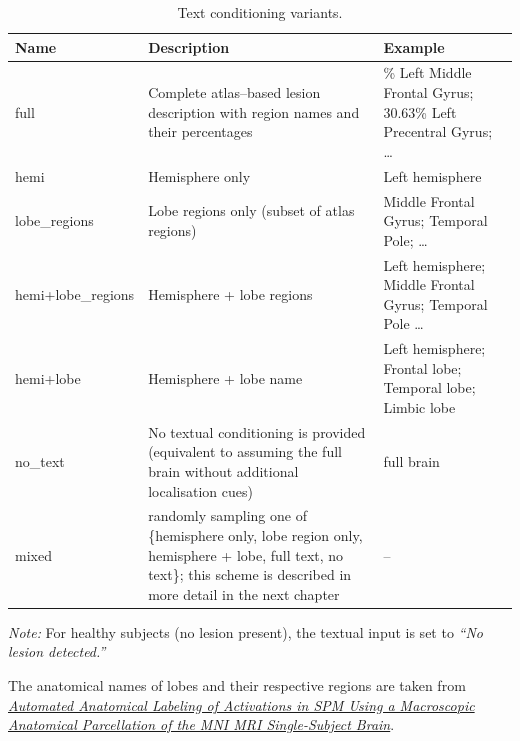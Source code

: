 \documentclass[FCD_GNN.tex]{subfiles}
\begin{document}
\begin{table}[t]
    \centering
    \caption{Text conditioning variants.}
    \label{tab:text_variants}
    \small
    \setlength{\tabcolsep}{6pt}
    \renewcommand{\arraystretch}{1.15}
        \begin{tabularx}{\textwidth}{l >{\raggedright\arraybackslash}X >{\raggedright\arraybackslash}X}
            \toprule
            \textbf{Name} & \textbf{Description} & \textbf{Example} \\
            \midrule
            full & Complete atlas--based lesion description with region names and their percentages &
            48.86\% Left Middle Frontal Gyrus; 30.63\% Left Precentral Gyrus; \dots \\
            \midrule
            hemi & Hemisphere only & Left hemisphere \\
            \midrule
            lobe\_regions & Lobe regions only (subset of atlas regions) &
            Middle Frontal Gyrus; Temporal Pole; \dots \\
            \midrule
            hemi+lobe\_regions & Hemisphere + lobe regions &
            Left hemisphere; Middle Frontal Gyrus; Temporal Pole \dots \\
            \midrule
            hemi+lobe & Hemisphere + lobe name & Left hemisphere; Frontal lobe; Temporal lobe; Limbic lobe \\
            \midrule
            no\_text & No textual conditioning is provided (equivalent to assuming the full brain without additional localisation cues) &
            full brain \\
            \midrule
            mixed & randomly sampling one of \{hemisphere only, lobe region only, hemisphere + lobe, full text, no text\}; this scheme is described in more detail in the next chapter & -- \\
            \bottomrule
        \end{tabularx}

        \vspace{2mm}
        {\footnotesize\textit{Note:} For healthy subjects (no lesion present), the textual input is set to \textit{``No lesion detected.''}}
    \end{table}

The anatomical names of lobes and their respective regions are taken from
\href{https://www.sciencedirect.com/science/article/pii/S1053811901909784}{\textit{Automated Anatomical Labeling of Activations in SPM Using a Macroscopic Anatomical Parcellation of the MNI MRI Single-Subject Brain}}.
\end{document}

